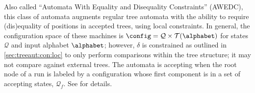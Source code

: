 Also called ``Automata With Equality and Disequality Constraints'' (AWEDC),
this class of automata augments regular tree automata with the ability to
require (dis)equality of positions in accepted trees, using local
constraints.  In general, the configuration space of these machines is
$\config = \mathcal{Q} \times \mathcal{T}(\alphabet)$ for states $\mathcal{Q}$
and input alphabet $\alphabet$; however, $\delta$ is constrained as outlined in
\autoref{sec:treeaut:con:loc} to only perform comparisons within the tree
structure; it may not compare against external trees.  The automata is
accepting when the root node of a run is labeled by a configuration whose
first component is in a set of accepting states, $\mathcal{Q}_f$.  See
\cite[Sec 4.2]{tata} for details.

